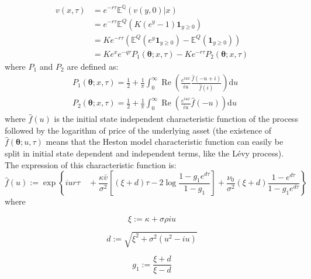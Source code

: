 \documentclass[12,twoside]{mammeTFM}
\theoremstyle{definition}
\theoremstyle{remark}
\newcommand{\E}{\ensuremath{\mathbb{E}}}
\newcommand{\Q}{\ensuremath{\mathbb{Q}}}
\begin{document}
\begin{align} 
\label{eq:option_valuation_expectation}
v(x, \tau) & = e^{-r \tau}\E^{\Q}(v(y, 0)|x) \\
& = e^{-r \tau} \E^{Q}(K(e^y - 1)\boldsymbol{1}_{y \geq 0}) \\  
\label{eq:option_valuation_useless}
 &  = Ke^{-r \tau}(\E^{Q}(e^y \boldsymbol{1}_{y \geq 0}) - \E^{Q}(\boldsymbol{1}_{y \geq 0})) \\
\label{eq:option_valuation_final_form}
 &  = K e^x e^{-q \tau} P_1(\boldsymbol{\theta}; x, \tau) - K e^{-r \tau} P_2(\boldsymbol{\theta}; x, \tau)
\end{align}
where $P_1$ and $P_2$ are defined as:
\begin{align}
&P_{1}(\boldsymbol{\theta} ; x, \tau)=\frac{1}{2}+\frac{1}{\pi} \int_{0}^{\infty} \operatorname{Re}\left(\frac{e^{i u x}}{i u} \frac{\hat{f}(-u+i)}{\hat{f}(i)}\right) \mathrm{d} u\\
&P_{2}(\boldsymbol{\theta} ; x, \tau)=\frac{1}{2}+\frac{1}{\pi} \int_{0}^{\infty} \operatorname{Re}\left(\frac{e^{iux}}{i u} \hat{f}(-u)\right) \mathrm{d} u
\end{align}
where $\hat{f}(u)$ is the initial state independent characteristic function of the process followed by the logarithm of price of the underlying asset (the existence of $\hat{f}(\boldsymbol{\theta}; u, \tau)$ means that the Heston model characteristic function can easily be split in initial state dependent and independent terms, like the L\'evy process). The expression of this characteristic function is:
\begin{equation} \label{eq:char_heston}
\hat{f}(u):=\exp \left\{i u r \tau \quad+\frac{\kappa \bar{v}}{\sigma^{2}}\left[(\xi+d) \tau-2 \log \frac{1-g_{1} e^{d \tau}}{1-g_{1}}\right]+\frac{\nu_{0}}{\sigma^{2}}(\xi+d) \frac{1-e^{d \tau}}{1-g_{1} e^{d \tau}}\right\}
\end{equation}
where

\noindent\begin{minipage}{.3\linewidth}
\begin{equation}
\xi:=\kappa + \sigma \rho i u
\end{equation}
\end{minipage}
\noindent\begin{minipage}{.4\linewidth}
\begin{equation} \label{eq:char_d}
d:=\sqrt{\xi^{2}+\sigma^{2}\left(u^{2} - i u\right)}
\end{equation}
\end{minipage}
\noindent\begin{minipage}{.3\linewidth}
\begin{equation}
g_{1}:=\frac{\xi+d}{\xi-d}
\end{equation}
\end{minipage}
\end{document}

